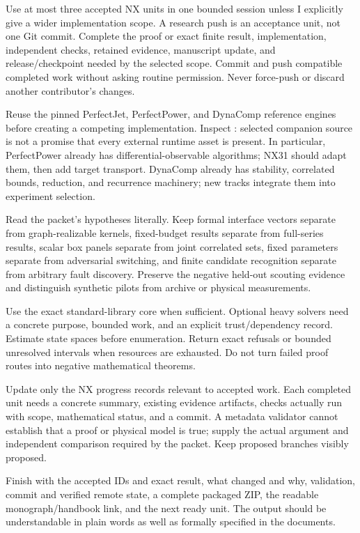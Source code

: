 \documentclass[
  11pt,
  a4paper,
]{report}
\let\nxtexttt\texttt
\renewcommand{\texttt}[1]{\nxtexttt{\seqsplit{#1}}}
\begin{document}
Use at most three accepted NX units in one bounded session unless I
explicitly give a wider implementation scope. A research push is an
acceptance unit, not one Git commit. Complete the proof or exact finite
result, implementation, independent checks, retained evidence,
manuscript update, and release/checkpoint needed by the selected scope.
Commit and push compatible completed work without asking routine
permission. Never force-push or discard another contributor's changes.

Reuse the pinned PerfectJet, PerfectPower, and DynaComp reference
engines before creating a competing implementation. Inspect
\texttt{COMPANION\_SOURCES.json}: selected companion source is not a
promise that every external runtime asset is present. In particular,
PerfectPower already has differential-observable algorithms; NX31 should
adapt them, then add target transport. DynaComp already has stability,
correlated bounds, reduction, and recurrence machinery; new tracks
integrate them into experiment selection.

Read the packet's hypotheses literally. Keep formal interface vectors
separate from graph-realizable kernels, fixed-budget results separate
from full-series results, scalar box panels separate from joint
correlated sets, fixed parameters separate from adversarial switching,
and finite candidate recognition separate from arbitrary fault
discovery. Preserve the negative held-out scouting evidence and
distinguish synthetic pilots from archive or physical measurements.

Use the exact standard-library core when sufficient. Optional heavy
solvers need a concrete purpose, bounded work, and an explicit
trust/dependency record. Estimate state spaces before enumeration.
Return exact refusals or bounded unresolved intervals when resources are
exhausted. Do not turn failed proof routes into negative mathematical
theorems.

Update only the NX progress records relevant to accepted work. Each
completed unit needs a concrete summary, existing evidence artifacts,
checks actually run with scope, mathematical status, and a commit. A
metadata validator cannot establish that a proof or physical model is
true; supply the actual argument and independent comparison required by
the packet. Keep proposed branches visibly proposed.

Finish with the accepted IDs and exact result, what changed and why,
validation, commit and verified remote state, a complete packaged ZIP,
the readable monograph/handbook link, and the next ready unit. The
output should be understandable in plain words as well as formally
specified in the documents.
\end{document}
